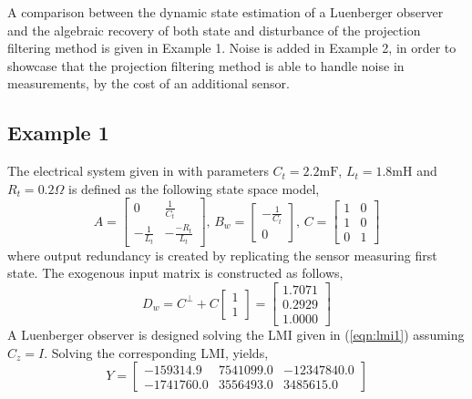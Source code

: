 A comparison between the dynamic state estimation of a Luenberger observer and the algebraic recovery of both state and disturbance of the projection filtering method is given in Example 1. Noise is added in Example 2, in order to showcase that the projection filtering method is able to handle noise in measurements, by the cost of an additional sensor. 
\subsection{Example 1}
The electrical system given in\cite{yang2025output} with parameters $C_t=2.2\mathrm{mF}$, $L_t=1.8\mathrm{mH}$ and $R_t=0.2\Omega$ is defined as the following state space model,
\begin{equation}
A=\begin{bmatrix}
    0& \frac{1}{C_t}\\
    -\frac{1}{L_t}& -\frac{-R_t}{L_t}    
\end{bmatrix},\,
B_w=\begin{bmatrix}
    -\frac{1}{C_t}\\
    0    
\end{bmatrix},\,
C=\begin{bmatrix}
    1& 0\\    
    1& 0\\    
    0& 1    
\end{bmatrix}
\end{equation}
where output redundancy is created by replicating the sensor measuring first state. The exogenous input matrix is constructed as follows,
\begin{equation}
    D_w=C^\perp+C\begin{bmatrix}1\\1\end{bmatrix}=\begin{bmatrix}
    1.7071\\
    0.2929\\
    1.0000
    \end{bmatrix}
\end{equation}
A Luenberger observer is designed solving the LMI given in (\ref{eqn:lmi1}) assuming $C_z=I$. Solving the corresponding LMI, yields,
\begin{equation}
    Y=\begin{bmatrix}
 -159314.9& 7541099.0& -12347840.0\\
-1741760.0& 3556493.0&   3485615.0
    \end{bmatrix}
\end{equation}
